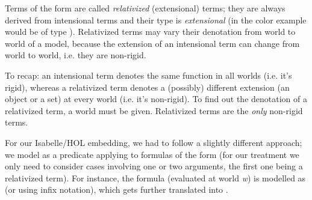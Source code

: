 \begin{isabellebody}
\begin{isamarkuptext}
\end{isamarkuptext}\isamarkuptrue%
%
\begin{isamarkuptext}%
Terms of the form \isa{{\isasymdown}{\isasymalpha}} are called \emph{relativized} (extensional) terms; they are always derived
from intensional terms and their type is \emph{extensional} (in the color example  would be of type \isa{{\isasymlangle}{\isasymzero}{\isasymrangle}}).
Relativized terms may vary their denotation from world to world of a model, because the extension of an intensional term can change
from world to world, i.e. they are non-rigid.%
\end{isamarkuptext}\isamarkuptrue%
%
\begin{isamarkuptext}%
To recap: an intensional term denotes the same function in all worlds (i.e. it's rigid), whereas a relativized term
denotes a (possibly) different extension (an object or a set) at every world (i.e. it's non-rigid). To find out
the denotation of a relativized term, a world must be given. Relativized terms are the \emph{only} non-rigid terms.%
\end{isamarkuptext}\isamarkuptrue%
%
\begin{isamarkuptext}%
For our Isabelle/HOL embedding, we had to follow a slightly different approach; we model \isa{{\isasymdown}}
as a predicate applying to formulas of the form  (for our treatment
we only need to consider cases involving one or two arguments, the first one being a relativized term).
For instance, the formula  (evaluated at world \emph{w}) is modelled as 
(or  using infix notation), which gets further translated into .


\end{isamarkuptext}
\end{isabellebody}
